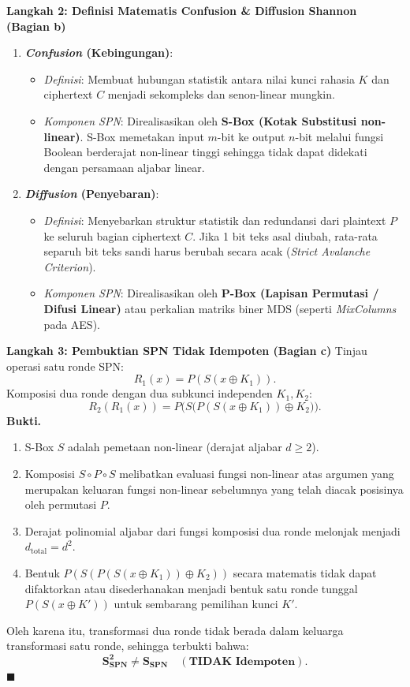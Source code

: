 \documentclass[11pt,a4paper]{article}
\newenvironment{proof}{\noindent\textbf{Bukti.}}{\hfill$\blacksquare$\vspace{0.3em}}
\begin{document}
\noindent\textbf{Langkah 2: Definisi Matematis Confusion \& Diffusion Shannon (Bagian b)}
\begin{enumerate}
    \item \textbf{\textit{Confusion} (Kebingungan)}:
    \begin{itemize}
        \item \textit{Definisi}: Membuat hubungan statistik antara nilai kunci rahasia $K$ dan ciphertext $C$ menjadi sekompleks dan senon-linear mungkin.
        \item \textit{Komponen SPN}: Direalisasikan oleh \textbf{S-Box (Kotak Substitusi non-linear)}. S-Box memetakan input $m$-bit ke output $n$-bit melalui fungsi Boolean berderajat non-linear tinggi sehingga tidak dapat didekati dengan persamaan aljabar linear.
    \end{itemize}
    \item \textbf{\textit{Diffusion} (Penyebaran)}:
    \begin{itemize}
        \item \textit{Definisi}: Menyebarkan struktur statistik dan redundansi dari plaintext $P$ ke seluruh bagian ciphertext $C$. Jika 1 bit teks asal diubah, rata-rata separuh bit teks sandi harus berubah secara acak (\textit{Strict Avalanche Criterion}).
        \item \textit{Komponen SPN}: Direalisasikan oleh \textbf{P-Box (Lapisan Permutasi / Difusi Linear)} atau perkalian matriks biner MDS (seperti \textit{MixColumns} pada AES).
    \end{itemize}
\end{enumerate}

\noindent\textbf{Langkah 3: Pembuktian SPN Tidak Idempoten (Bagian c)}
Tinjau operasi satu ronde SPN:
\[
R_1(x) = P(S(x \oplus K_1)).
\]
Komposisi dua ronde dengan dua subkunci independen $K_1, K_2$:
\[
R_2(R_1(x)) = P\Big( S\big( P(S(x \oplus K_1)) \oplus K_2 \big) \Big).
\]
\begin{proof}
\begin{enumerate}
    \item S-Box $S$ adalah pemetaan non-linear (derajat aljabar $d \ge 2$).
    \item Komposisi $S \circ P \circ S$ melibatkan evaluasi fungsi non-linear atas argumen yang merupakan keluaran fungsi non-linear sebelumnya yang telah diacak posisinya oleh permutasi $P$.
    \item Derajat polinomial aljabar dari fungsi komposisi dua ronde melonjak menjadi $d_{\text{total}} = d^2$.
    \item Bentuk $P(S(P(S(x \oplus K_1)) \oplus K_2))$ secara matematis tidak dapat difaktorkan atau disederhanakan menjadi bentuk satu ronde tunggal $P(S(x \oplus K'))$ untuk sembarang pemilihan kunci $K'$.
\end{enumerate}
Oleh karena itu, transformasi dua ronde tidak berada dalam keluarga transformasi satu ronde, sehingga terbukti bahwa:
\[
\mathbf{S_{\text{SPN}}^2 \neq S_{\text{SPN}} \quad (\text{TIDAK Idempoten})}.
\]
\end{proof}
\end{document}
